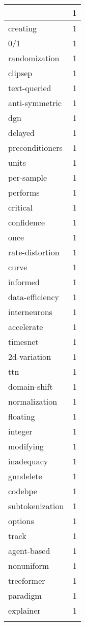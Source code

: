 \begin{table}[h]
\begin{tabular}{|l|r|}
{\hline
logicdp & 1 \\
\hline
creating & 1 \\
\hline
0/1 & 1 \\
\hline
randomization & 1 \\
\hline
clipsep & 1 \\
\hline
text-queried & 1 \\
\hline
anti-symmetric & 1 \\
\hline
dgn & 1 \\
\hline
delayed & 1 \\
\hline
preconditioners & 1 \\
\hline
units & 1 \\
\hline
per-sample & 1 \\
\hline
performs & 1 \\
\hline
critical & 1 \\
\hline
confidence & 1 \\
\hline
once & 1 \\
\hline
rate-distortion & 1 \\
\hline
curve & 1 \\
\hline
informed & 1 \\
\hline
data-efficiency & 1 \\
\hline
interneurons & 1 \\
\hline
accelerate & 1 \\
\hline
timesnet & 1 \\
\hline
2d-variation & 1 \\
\hline
ttn & 1 \\
\hline
domain-shift & 1 \\
\hline
normalization & 1 \\
\hline
floating & 1 \\
\hline
integer & 1 \\
\hline
modifying & 1 \\
\hline
inadequacy & 1 \\
\hline
gnndelete & 1 \\
\hline
codebpe & 1 \\
\hline
subtokenization & 1 \\
\hline
options & 1 \\
\hline
track & 1 \\
\hline
agent-based & 1 \\
\hline
nonuniform & 1 \\
\hline
treeformer & 1 \\
\hline
paradigm & 1 \\
\hline
explainer & 1 \\
}
\end{tabular}
\end{table}
